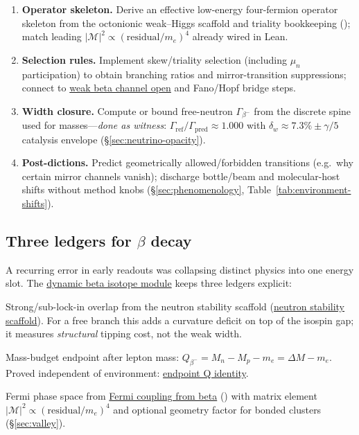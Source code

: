 \documentclass[11pt,notitlepage]{amsart}
\begin{document}
\begin{enumerate}[label=\textbf{M\arabic*}, leftmargin=2.4em, labelsep=0.65em, itemsep=0.45em]
\item \textbf{Operator skeleton.}
  Derive an effective low-energy four-fermion operator skeleton from the octonionic
  weak--Higgs scaffold and triality bookkeeping (\cite{hqiv-tuft-sm-lagrangian-paper});
  match leading $|\mathcal{M}|^2\propto(\mathrm{residual}/m_e)^4$ already wired in Lean.
\item \textbf{Selection rules.}
  Implement skew/triality selection (including $\mu_n$ participation) to obtain
  branching ratios and mirror-transition suppressions; connect to
  \hyperref[lean:weak-channel-open]{weak beta channel open} and Fano/Hopf bridge steps.
\item \textbf{Width closure.}
  Compute or bound free-neutron $\Gamma_{\beta^-}$ from the discrete spine used for
  masses---\emph{done as witness}: $\Gamma_{\mathrm{ref}}/\Gamma_{\mathrm{pred}}\approx 1.000$
  with $\delta_w\approx 7.3\%\pm\gamma/5$ catalysis envelope
  (\S\ref{sec:neutrino-opacity}).
\item \textbf{Post-dictions.}
  Predict geometrically allowed/forbidden transitions (e.g.\ why certain mirror channels
  vanish); discharge bottle/beam and molecular-host shifts without method knobs
  (\S\ref{sec:phenomenology}, Table~\ref{tab:environment-shifts}).
\end{enumerate}

\subsection{Three ledgers for $\beta$ decay}
\label{sec:three-ledgers}

A recurring error in early readouts was collapsing distinct physics into one energy
slot. The \hyperref[lean:dynamic-beta]{dynamic beta isotope module} keeps three
ledgers explicit:

\begin{description}[leftmargin=1.5em,labelwidth=2.35cm,labelsep=0.5em,style=nextline,font=\bfseries]
\item[Ledger I]
  \normalfont Strong/sub-lock-in overlap from the neutron stability scaffold
  (\hyperref[lean:neutron-scaffold]{neutron stability scaffold}).
  For a free branch this adds a curvature deficit on top of the isospin gap; it
  measures \emph{structural} tipping cost, not the weak width.
\item[Ledger II]
  \normalfont Mass-budget endpoint after lepton mass:
  $Q_{\beta^-}=M_n-M_p-m_e=\Delta M-m_e$.
  Proved independent of environment:
  \hyperref[lean:endpoint-q-theorem]{endpoint Q identity}.
\item[Ledger III]
  \normalfont Fermi phase space from \hyperref[lean:gf-from-beta]{Fermi coupling from beta}
  (\cite{hqiv-tuft-sm-lagrangian-paper}) with matrix element
  $|\mathcal{M}|^2\propto(\mathrm{residual}/m_e)^4$ and optional geometry factor
  for bonded clusters (\S\ref{sec:valley}).
\end{description}
\end{document}
